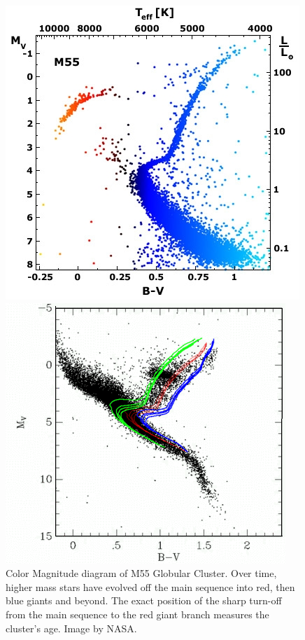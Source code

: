 \begin{figure}[H]
  \centering
  \begin{minipage}[b]{0.44\textwidth}
    \includegraphics[width=\textwidth]{images/m55_diagram.jpg}
    \caption[Color Magnitude diagram of M55]{Color Magnitude diagram of M55 Globular Cluster. Over time, higher mass stars have evolved off the main sequence into red, then blue giants and beyond. The exact position of the sharp turn-off from the main sequence to the red giant branch measures the cluster's age. Image by NASA.}
  \end{minipage}
  \hfill
  \begin{minipage}[b]{0.55\textwidth}
    \includegraphics[width=\textwidth]{images/color-magnitude.png}

\end{minipage}
\end{figure}
